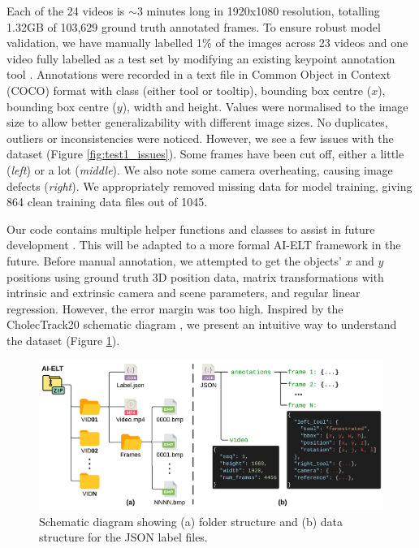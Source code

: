 Each of the 24 videos is $\sim$3 minutes long in 1920x1080 resolution, totalling 1.32GB of 103,629 ground truth annotated frames. To ensure robust model validation, we have manually labelled 1\% of the images across 23 videos and one video fully labelled as a test set by modifying an existing keypoint annotation tool \cite{herrera_luiscarlosgphkeypoint-annotation-tool_2024}. Annotations were recorded in a text file in Common Object in Context (COCO) format with class (either tool or tooltip), bounding box centre ($x$), bounding box centre ($y$), width and height. Values were normalised to the image size to allow better generalizability with different image sizes. No duplicates, outliers or inconsistencies were noticed. However, we see a few issues with the dataset (Figure \ref{fig:test1_issues}). Some frames have been cut off, either a little (\textit{left}) or a lot (\textit{middle}). We also note some camera overheating, causing image defects (\textit{right}). We appropriately removed missing data for model training, giving 864 clean training data files out of 1045.

Our code contains multiple helper functions and classes to assist in future development \cite{choudhry_omarioscmsc-surgical-tool-tracking_2024}. This will be adapted to a more formal AI-ELT framework in the future. Before manual annotation, we attempted to get the objects' $x$ and $y$ positions using ground truth 3D position data, matrix transformations with intrinsic and extrinsic camera and scene parameters, and regular linear regression. However, the error margin was too high. Inspired by the CholecTrack20 schematic diagram \cite{nwoye_cholectrack20_2023}, we present an intuitive way to understand the dataset (Figure \ref{fig:schematic_diagram}).

\begin{figure}[hbp]
    \centering
    \vspace*{-2mm}
    \includegraphics[width=\linewidth]{schematic_diagram.png}
    \vspace*{-7.5mm}
    \caption{Schematic diagram showing (a) folder structure and (b) data structure for the JSON label files.}
    \vspace*{-5mm}
    \label{fig:schematic_diagram}
\end{figure}

